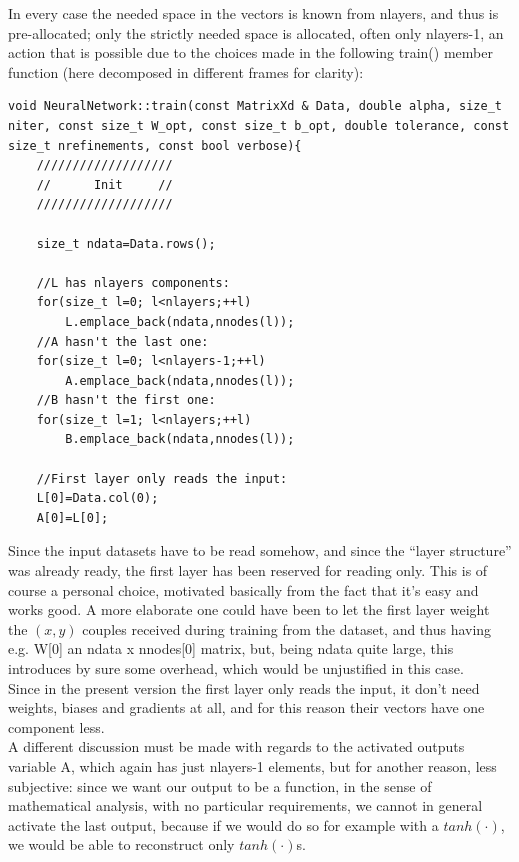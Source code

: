 \documentclass[12pt, a4paper]{report}
\theoremstyle{definition}
\begin{document}
In every case the needed space in the vectors is known from {\ttfamily nlayers}, and thus is pre-allocated; only the strictly needed space is allocated, often only {\ttfamily nlayers-1}, an action that is possible due to the choices made in the following {\ttfamily train()} member function (here decomposed in different frames for clarity):
\begin{lstlisting}[frame=single, showstringspaces=false]
void NeuralNetwork::train(const MatrixXd & Data, double alpha, size_t niter, const size_t W_opt, const size_t b_opt, double tolerance, const size_t nrefinements, const bool verbose){                     
	///////////////////
	//      Init     //
	///////////////////

	size_t ndata=Data.rows();

	//L has nlayers components:
	for(size_t l=0; l<nlayers;++l)
		L.emplace_back(ndata,nnodes(l));
	//A hasn't the last one:
	for(size_t l=0; l<nlayers-1;++l)
		A.emplace_back(ndata,nnodes(l));
	//B hasn't the first one:
	for(size_t l=1; l<nlayers;++l)
		B.emplace_back(ndata,nnodes(l));

	//First layer only reads the input:
	L[0]=Data.col(0); 
	A[0]=L[0];	
\end{lstlisting}
Since the input datasets have to be read somehow, and since the ``layer structure'' was already ready, the first layer has been reserved for reading only. This is of course a personal choice, motivated basically from the fact that it's easy and works good. A more elaborate one could have been to let the first layer weight the $(x,y)$ couples received during training from the dataset, and thus having e.g. {\ttfamily W[0]} an {\ttfamily ndata x nnodes[0]} matrix, but, being {\ttfamily ndata} quite large, this introduces by sure some overhead, which would be unjustified in this case.\\
Since in the present version the first layer only reads the input, it don't need weights, biases and gradients at all, and for this reason their vectors have one component less.\\
A different discussion must be made with regards to the activated outputs variable {\ttfamily A}, which again has just {\ttfamily nlayers-1} elements, but for another reason, less subjective: since we want our output to be a function, in the sense of mathematical analysis, with no particular requirements, we cannot in general activate the last output, because if we would do so for example with a $tanh(\cdot)$, we would be able to reconstruct only $tanh(\cdot)$s.\\
\end{document}
